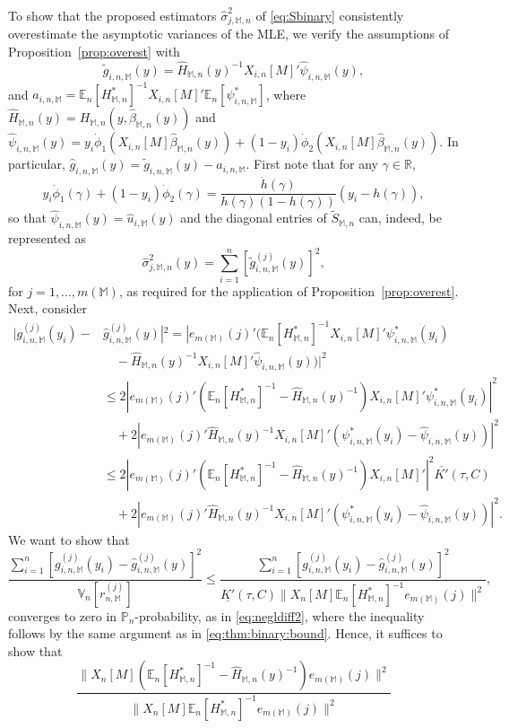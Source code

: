 \documentclass[preprint]{imsart}
\newcommand{\R}{{\mathbb R}}
\newcommand{\E}{{\mathbb E}}
\newcommand{\V}{{\mathbb V}}
\renewcommand{\P}{{\mathbb P}}
\newcommand{\M}{\mathbb M}
\numberwithin{equation}{section}
\begin{document}
To show that the proposed estimators $\hat{\sigma}_{j,\M,n}^2$ of \eqref{eq:Sbinary} consistently overestimate the asymptotic variances of the MLE, we verify the assumptions of Proposition~\ref{prop:overest} with 
$$
\tilde{g}_{i,n,\M}(y) = \hat{H}_{\M,n}(y)^{-1}X_{i,n}[M]'\hat{\psi}_{i,n,\M}(y),
$$ 
and $a_{i,n,\M} = \E_n[H_{\M,n}^*]^{-1}X_{i,n}[M]'\E_n[\psi_{i,n,\M}^*]$,
where $\hat{H}_{\M,n}(y) = H_{\M,n}(y,\hat{\beta}_{\M,n}(y))$ and $\hat{\psi}_{i,n,\M}(y) = y_i\dot{\phi}_1(X_{i,n}[M]\hat{\beta}_{\M,n}(y)) + (1-y_i)\dot{\phi}_2(X_{i,n}[M]\hat{\beta}_{\M,n}(y))$. In particular, $\hat{g}_{i,n,\M}(y) = \tilde{g}_{i,n,\M}(y) - a_{i,n,\M}$. First note that for any $\gamma\in\R$,
$$
y_i \dot{\phi}_1(\gamma) + (1-y_i)\dot{\phi}_2(\gamma) = 
\frac{\dot{h}(\gamma)}{h(\gamma)(1-h(\gamma))}(y_i-h(\gamma)),
$$ 
so that $\hat{\psi}_{i,n,\M}(y) = \hat{u}_{i,\M}(y)$ and the diagonal entries of $\tilde{S}_{\M,n}$ can, indeed, be represented as
$$
\hat{\sigma}_{j,\M,n}^2(y) = \sum_{i=1}^n\left[ \tilde{g}_{i,n,\M}^{(j)}(y)\right]^2,
$$
for $j=1, \dots, m(\M)$, as required for the application of Proposition~\ref{prop:overest}. Next, consider 
\begin{align*}
|g_{i,n,\M}^{(j)}(y_i) - &\hat{g}^{(j)}_{i,n,\M}(y)|^2
=
|e_{m(\M)}(j)'\Big(\E_n[H_{\M,n}^*]^{-1} X_{i,n}[M]' \psi_{i,n,\M}^*(y_i) \\
&\quad- \hat{H}_{\M,n}(y)^{-1}X_{i,n}[M]'\hat{\psi}_{i,n,\M}(y)\Big)|^2\\
&\le
2|e_{m(\M)}(j)'(\E_n[H_{\M,n}^*]^{-1} - \hat{H}_{\M,n}(y)^{-1})X_{i,n}[M]' \psi_{i,n,\M}^*(y_i)|^2\\
&\quad+
2|e_{m(\M)}(j)'\hat{H}_{\M,n}(y)^{-1}X_{i,n}[M]' (\psi_{i,n,\M}^*(y_i) - \hat{\psi}_{i,n,\M}(y))|^2\\
&\le
2|e_{m(\M)}(j)'(\E_n[H_{\M,n}^*]^{-1} - \hat{H}_{\M,n}(y)^{-1})X_{i,n}[M]'|^2 \overline{K'}(\tau, C)\\
&\quad+
2|e_{m(\M)}(j)'\hat{H}_{\M,n}(y)^{-1}X_{i,n}[M]' (\psi_{i,n,\M}^*(y_i) - \hat{\psi}_{i,n,\M}(y))|^2.
\end{align*}
We want to show that
$$
\frac{\sum_{i=1}^n \left[ g_{i,n,\M}^{(j)}(y_i) - \hat{g}_{i,n,\M}^{(j)}(y) \right]^2}{\V_n[r_{n,\M}^{(j)}]}
\le
\frac{\sum_{i=1}^n \left[ g_{i,n,\M}^{(j)}(y_i) - \hat{g}_{i,n,\M}^{(j)}(y) \right]^2}{\underline{K'}(\tau,C) \|X_n[M]\E_n[H_{\M,n}^*]^{-1}e_{m(\M)}(j) \|^2},
$$
converges to zero in $\P_n$-probability, as in \eqref{eq:negldiff2}, where the inequality follows by the same argument as in \eqref{eq:thm:binary:bound}. Hence, it suffices to show that
\begin{equation}\label{eq:thm:binary:conv1}
\frac{\|X_n[M](\E_n[H_{\M,n}^*]^{-1} - \hat{H}_{\M,n}(y)^{-1})e_{m(\M)}(j)\|^2 }{\|X_n[M]\E_n[H_{\M,n}^*]^{-1}e_{m(\M)}(j) \|^2}
\end{equation}
\end{document}
